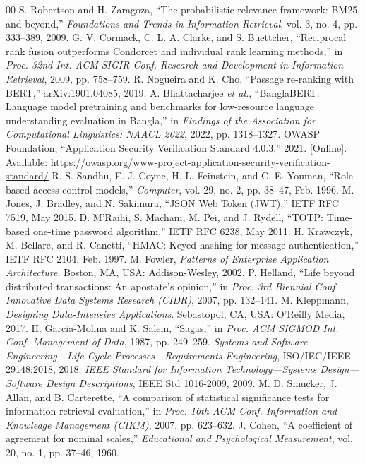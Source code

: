 \documentclass[conference,a4paper]{IEEEtran}
\begin{document}
\begin{thebibliography}{00}
 S. Robertson and H. Zaragoza, ``The probabilistic relevance framework: BM25 and beyond,'' \textit{Foundations and Trends in Information Retrieval}, vol. 3, no. 4, pp. 333--389, 2009.
 G. V. Cormack, C. L. A. Clarke, and S. Buettcher, ``Reciprocal rank fusion outperforms Condorcet and individual rank learning methods,'' in \textit{Proc. 32nd Int. ACM SIGIR Conf. Research and Development in Information Retrieval}, 2009, pp. 758--759.
 R. Nogueira and K. Cho, ``Passage re-ranking with BERT,'' arXiv:1901.04085, 2019.
 A. Bhattacharjee \textit{et al.}, ``BanglaBERT: Language model pretraining and benchmarks for low-resource language understanding evaluation in Bangla,'' in \textit{Findings of the Association for Computational Linguistics: NAACL 2022}, 2022, pp. 1318--1327.
 OWASP Foundation, ``Application Security Verification Standard 4.0.3,'' 2021. [Online]. Available: \url{https://owasp.org/www-project-application-security-verification-standard/}
 R. S. Sandhu, E. J. Coyne, H. L. Feinstein, and C. E. Youman, ``Role-based access control models,'' \textit{Computer}, vol. 29, no. 2, pp. 38--47, Feb. 1996.
 M. Jones, J. Bradley, and N. Sakimura, ``JSON Web Token (JWT),'' IETF RFC 7519, May 2015.
 D. M'Raihi, S. Machani, M. Pei, and J. Rydell, ``TOTP: Time-based one-time password algorithm,'' IETF RFC 6238, May 2011.
 H. Krawczyk, M. Bellare, and R. Canetti, ``HMAC: Keyed-hashing for message authentication,'' IETF RFC 2104, Feb. 1997.
 M. Fowler, \textit{Patterns of Enterprise Application Architecture}. Boston, MA, USA: Addison-Wesley, 2002.
 P. Helland, ``Life beyond distributed transactions: An apostate's opinion,'' in \textit{Proc. 3rd Biennial Conf. Innovative Data Systems Research (CIDR)}, 2007, pp. 132--141.
 M. Kleppmann, \textit{Designing Data-Intensive Applications}. Sebastopol, CA, USA: O'Reilly Media, 2017.
 H. Garcia-Molina and K. Salem, ``Sagas,'' in \textit{Proc. ACM SIGMOD Int. Conf. Management of Data}, 1987, pp. 249--259.
 \textit{Systems and Software Engineering---Life Cycle Processes---Requirements Engineering}, ISO/IEC/IEEE 29148:2018, 2018.
 \textit{IEEE Standard for Information Technology---Systems Design---Software Design Descriptions}, IEEE Std 1016-2009, 2009.
 M. D. Smucker, J. Allan, and B. Carterette, ``A comparison of statistical significance tests for information retrieval evaluation,'' in \textit{Proc. 16th ACM Conf. Information and Knowledge Management (CIKM)}, 2007, pp. 623--632.
 J. Cohen, ``A coefficient of agreement for nominal scales,'' \textit{Educational and Psychological Measurement}, vol. 20, no. 1, pp. 37--46, 1960.
\end{thebibliography}
\end{document}
